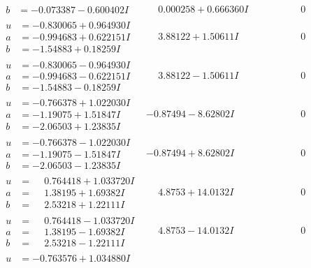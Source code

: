 \documentclass[1p]{elsarticle_modified}
\theoremstyle{definition}
\begin{document}
$$\begin{array}{c|c|c}
\begin{aligned}
b &= -0.073387 - 0.600402 I\end{aligned}
 & \phantom{-}0.000258 + 0.666360 I & \phantom{-0.000000 } 0 \\ \hline\begin{aligned}
u &= -0.830065 + 0.964930 I \\
a &= -0.994683 + 0.622151 I \\
b &= -1.54883 + 0.18259 I\end{aligned}
 & \phantom{-}3.88122 + 1.50611 I & \phantom{-0.000000 } 0 \\ \hline\begin{aligned}
u &= -0.830065 - 0.964930 I \\
a &= -0.994683 - 0.622151 I \\
b &= -1.54883 - 0.18259 I\end{aligned}
 & \phantom{-}3.88122 - 1.50611 I & \phantom{-0.000000 } 0 \\ \hline\begin{aligned}
u &= -0.766378 + 1.022030 I \\
a &= -1.19075 + 1.51847 I \\
b &= -2.06503 + 1.23835 I\end{aligned}
 & -0.87494 - 8.62802 I & \phantom{-0.000000 } 0 \\ \hline\begin{aligned}
u &= -0.766378 - 1.022030 I \\
a &= -1.19075 - 1.51847 I \\
b &= -2.06503 - 1.23835 I\end{aligned}
 & -0.87494 + 8.62802 I & \phantom{-0.000000 } 0 \\ \hline\begin{aligned}
u &= \phantom{-}0.764418 + 1.033720 I \\
a &= \phantom{-}1.38195 + 1.69382 I \\
b &= \phantom{-}2.53218 + 1.22111 I\end{aligned}
 & \phantom{-}4.8753 + 14.0132 I & \phantom{-0.000000 } 0 \\ \hline\begin{aligned}
u &= \phantom{-}0.764418 - 1.033720 I \\
a &= \phantom{-}1.38195 - 1.69382 I \\
b &= \phantom{-}2.53218 - 1.22111 I\end{aligned}
 & \phantom{-}4.8753 - 14.0132 I & \phantom{-0.000000 } 0 \\ \hline\begin{aligned}
u &= -0.763576 + 1.034880 I \\

\end{aligned}
\end{array}$$
\end{document}
